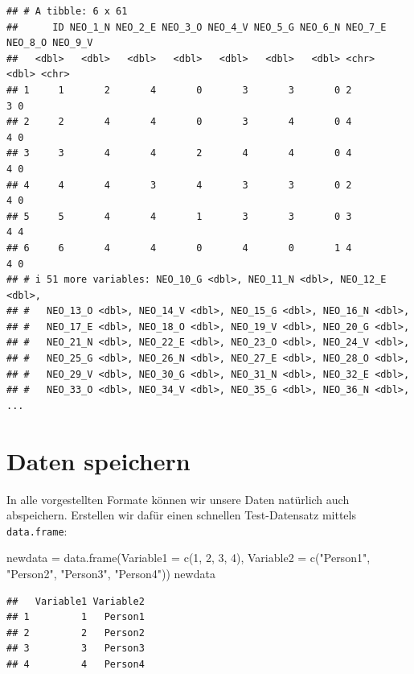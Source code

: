 \documentclass[
]{book}
\newenvironment{Shaded}{\begin{snugshade}}{\end{snugshade}}
\newcommand{\AttributeTok}[1]{\textcolor[rgb]{0.77,0.63,0.00}{#1}}
\newcommand{\DecValTok}[1]{\textcolor[rgb]{0.00,0.00,0.81}{#1}}
\newcommand{\FunctionTok}[1]{\textcolor[rgb]{0.00,0.00,0.00}{#1}}
\newcommand{\NormalTok}[1]{#1}
\newcommand{\OtherTok}[1]{\textcolor[rgb]{0.56,0.35,0.01}{#1}}
\newcommand{\StringTok}[1]{\textcolor[rgb]{0.31,0.60,0.02}{#1}}
\begin{document}
\begin{verbatim}
## # A tibble: 6 x 61
##      ID NEO_1_N NEO_2_E NEO_3_O NEO_4_V NEO_5_G NEO_6_N NEO_7_E NEO_8_O NEO_9_V
##   <dbl>   <dbl>   <dbl>   <dbl>   <dbl>   <dbl>   <dbl> <chr>     <dbl> <chr>  
## 1     1       2       4       0       3       3       0 2             3 0      
## 2     2       4       4       0       3       4       0 4             4 0      
## 3     3       4       4       2       4       4       0 4             4 0      
## 4     4       4       3       4       3       3       0 2             4 0      
## 5     5       4       4       1       3       3       0 3             4 4      
## 6     6       4       4       0       4       0       1 4             4 0      
## # i 51 more variables: NEO_10_G <dbl>, NEO_11_N <dbl>, NEO_12_E <dbl>,
## #   NEO_13_O <dbl>, NEO_14_V <dbl>, NEO_15_G <dbl>, NEO_16_N <dbl>,
## #   NEO_17_E <dbl>, NEO_18_O <dbl>, NEO_19_V <dbl>, NEO_20_G <dbl>,
## #   NEO_21_N <dbl>, NEO_22_E <dbl>, NEO_23_O <dbl>, NEO_24_V <dbl>,
## #   NEO_25_G <dbl>, NEO_26_N <dbl>, NEO_27_E <dbl>, NEO_28_O <dbl>,
## #   NEO_29_V <dbl>, NEO_30_G <dbl>, NEO_31_N <dbl>, NEO_32_E <dbl>,
## #   NEO_33_O <dbl>, NEO_34_V <dbl>, NEO_35_G <dbl>, NEO_36_N <dbl>, ...
\end{verbatim}

\hypertarget{daten-speichern}{%
\section{Daten speichern}\label{daten-speichern}}

In alle vorgestellten Formate können wir unsere Daten natürlich auch abspeichern. Erstellen wir dafür einen schnellen Test-Datensatz mittels \texttt{data.frame}:

\begin{Shaded}
\begin{Highlighting}[]
\NormalTok{newdata }\OtherTok{=} \FunctionTok{data.frame}\NormalTok{(}\AttributeTok{Variable1 =} \FunctionTok{c}\NormalTok{(}\DecValTok{1}\NormalTok{, }\DecValTok{2}\NormalTok{, }\DecValTok{3}\NormalTok{, }\DecValTok{4}\NormalTok{),}
                     \AttributeTok{Variable2 =} \FunctionTok{c}\NormalTok{(}\StringTok{"Person1"}\NormalTok{, }\StringTok{"Person2"}\NormalTok{, }\StringTok{"Person3"}\NormalTok{, }\StringTok{"Person4"}\NormalTok{))}
\NormalTok{newdata}
\end{Highlighting}
\end{Shaded}

\begin{verbatim}
##   Variable1 Variable2
## 1         1   Person1
## 2         2   Person2
## 3         3   Person3
## 4         4   Person4
\end{verbatim}
\end{document}
